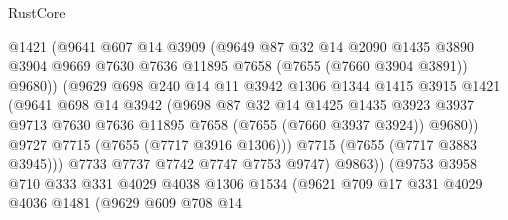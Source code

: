 \begin{lexlean}{RustCore}
\begin{coremodule}
                        @1421
                        (@9641
                          @607
                          @14
                          @3909
                          (@9649
                            @87
                            @32
                            @14
                            @2090
                            @1435
                            @3890
                            @3904
                            @9669
                            @7630
                            @7636
                            @11895
                            @7658
                            (@7655 (@7660 @3904 @3891))
                            @9680))
                        (@9629
                          @698
                          @240
                          @14
                          @11
                          @3942
                          @1306
                          @1344
                          @1415
                          @3915
                          @1421
                          (@9641
                            @698
                            @14
                            @3942
                            (@9698
                              @87
                              @32
                              @14
                              @1425
                              @1435
                              @3923
                              @3937
                              @9713
                              @7630
                              @7636
                              @11895
                              @7658
                              (@7655 (@7660 @3937 @3924))
                              @9680))
                          @9727
                          @7715
                          (@7655 (@7717 @3916 @1306)))
                        @7715
                        (@7655 (@7717 @3883 @3945)))
                      @7733
                      @7737
                      @7742
                      @7747
                      @7753
                      @9747)
                    @9863))
                (@9753
                  @3958
                  @710
                  @333
                  @331
                  @4029
                  @4038
                  @1306
                  @1534
                  (@9621
                    @709
                    @17
                    @331
                    @4029
                    @4036
                    @1481
                    (@9629
                      @609
                      @708
                      @14

\end{coremodule}
\end{lexlean}
